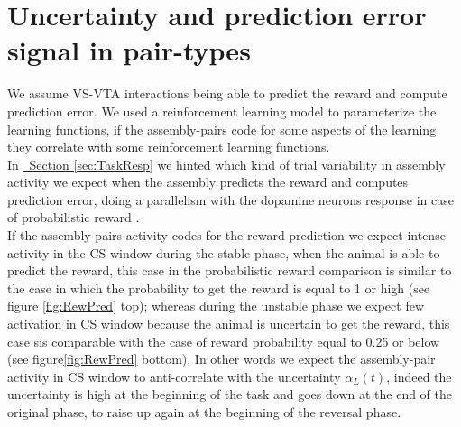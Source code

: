 \section{Uncertainty and prediction error signal in pair-types}
\label{sec:CorrRL}
We assume VS-VTA interactions being able to predict the reward and compute prediction error. We used a reinforcement learning model to parameterize the learning functions, if the assembly-pairs code for some aspects of the learning they correlate with some reinforcement learning functions.\\
In \hyperref[sec:TaskResp]{~Section \ref*{sec:TaskResp}} we hinted which kind of trial variability in assembly activity we expect when the assembly predicts the reward and computes prediction error, doing a parallelism with the dopamine neurons response in case of probabilistic reward \cite{Fiorillo}.\\
If the assembly-pairs activity codes for the reward prediction we expect intense activity in the CS window during the stable phase, when the animal is able to predict the reward, this case in the probabilistic reward comparison is similar to the case in which the probability to get the reward is equal to 1 or high (see figure \ref{fig:RewPred} top); whereas during the unstable phase we expect few activation in CS window because the animal is uncertain to get the reward, this case sis comparable with the case of reward probability equal to 0.25 or below (see figure\ref{fig:RewPred} bottom). In other words we expect the assembly-pair activity in CS window to anti-correlate with the uncertainty $\alpha_L(t)$, indeed the uncertainty is high at the beginning of the task and goes down at the end of the original phase, to raise up again at the beginning of the reversal phase. 
